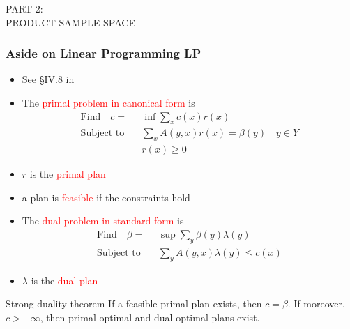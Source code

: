 \documentclass[xcolor=svgnames]{beamer}
\newcommand{\rosso}[1]{\textcolor{red}{#1}}
\renewcommand{\emph}{\rosso}
\begin{document}
\begin{frame}

    \huge PART 2: \\
    PRODUCT SAMPLE SPACE
    
\end{frame}


\begin{frame}\small\frametitle{Aside on Linear Programming LP}

\begin{itemize}  \item See \S IV.8 in 
\end{itemize}

  \begin{itemize}
  \item The \emph{primal problem in canonical form} is
    \begin{align*}
      \text{Find} \quad c =& \inf \sum_x c(x) r(x) \\
      \text{Subject to} \quad &\sum_x A(y,x) r(x) = \beta(y) \quad y \in Y \\
      &r(x) \geq 0
    \end{align*}
  \item $r$ is the \emph{primal plan}
  \item a plan is \emph{feasible} if the constraints hold
  \end{itemize}

  \begin{itemize}
  \item The \emph{dual problem in standard form} is
    \begin{align*}
      \text{Find} \quad \beta =& \sup \sum_y \beta(y) \lambda(y) \\
      \text{Subject to} \quad &\sum_y A(y,x) \lambda(y) \leq c(x) 
    \end{align*}
  \item $\lambda$ is the \emph{dual plan}
  \end{itemize}

  \begin{block}{Strong duality theorem}
  If a feasible primal plan exists, then $c = \beta$. If moreover, $c > -\infty$, then primal optimal and dual optimal plans exist.  
  \end{block}
\end{frame}
\end{document}
